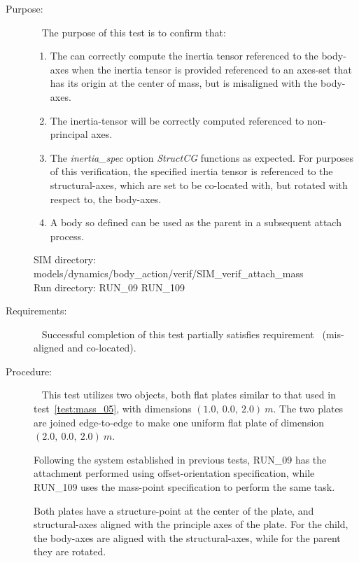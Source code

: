 \label{test:mass_09}
\begin{description}
\item[Purpose:] \ \newline
The purpose of this test is to confirm that:
\begin{enumerate}
 \item  The \ModelDesc 
can correctly compute the inertia tensor referenced to the body-axes when the 
inertia tensor is provided referenced to an axes-set that 
has its origin at the center of mass, but is misaligned with the body-axes.
\item The inertia-tensor will be correctly computed referenced to non-principal
axes.
\item The \textit{inertia\_spec} option \textit{StructCG} functions as 
expected.  For purposes of this verification, the specified inertia tensor is 
referenced to the structural-axes, which are set to 
be co-located with, but rotated with respect 
to, the body-axes.
\item A body so defined can be used as the parent in a 
subsequent attach process.
\end{enumerate}

SIM directory: models/dynamics/body\_action/verif/SIM\_verif\_attach\_mass\\
Run directory: RUN\_09 RUN\_109


\item[Requirements:] \ \newline
Successful completion of this test partially satisfies
requirement~ (mis-aligned and co-located).


\item[Procedure:]\ \newline
This test utilizes two objects, both flat plates similar to that used in 
test~\ref{test:mass_05}, with dimensions $(1.0, ~0.0, ~2.0) ~m$.  The two 
plates are joined edge-to-edge to 
make one uniform flat plate of dimension $(2.0, ~0.0, ~2.0) ~m$.

Following the system established in previous tests, RUN\_09 has the attachment 
performed using offset-orientation specification, while RUN\_109 uses the 
mass-point specification to perform the same task.

Both plates have a  
structure-point at the center of the plate, and structural-axes aligned with 
the principle axes of the plate.  For the child, the body-axes are aligned 
with the structural-axes, while for the parent they are rotated.


\end{description}
